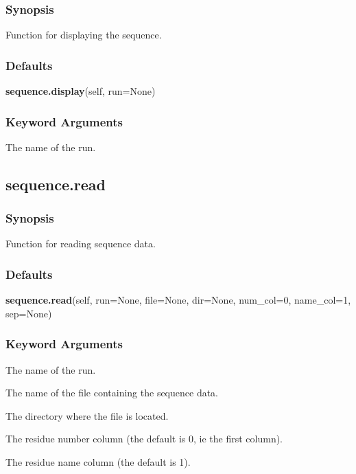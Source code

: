 \subsubsection{Synopsis}

Function for displaying the sequence.

\subsubsection{Defaults}

\textsf{\textbf{sequence.display}(self, run=None)}


\subsubsection{Keyword Arguments}


  The name of the run.


\newpage

\subsection{sequence.read}


\subsubsection{Synopsis}

Function for reading sequence data.

\subsubsection{Defaults}

\textsf{\textbf{sequence.read}(self, run=None, file=None, dir=None, num\_col=0, name\_col=1, sep=None)}


\subsubsection{Keyword Arguments}


  The name of the run.

  The name of the file containing the sequence data.

  The directory where the file is located.

  The residue number column (the default is 0, ie the first column).

  The residue name column (the default is 1).

